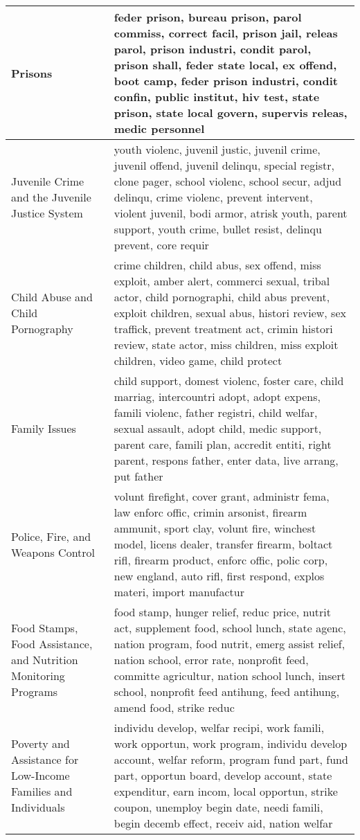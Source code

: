 \begin{longtable}{p{}p{}}
   \hline
Prisons & feder prison, bureau prison, parol commiss, correct facil, prison jail, releas parol, prison industri, condit parol, prison shall, feder state local, ex offend, boot camp, feder prison industri, condit confin, public institut, hiv test, state prison, state local govern, supervis releas, medic personnel \\ 
   \hline
Juvenile Crime and the Juvenile Justice System & youth violenc, juvenil justic, juvenil crime, juvenil offend, juvenil delinqu, special registr, clone pager, school violenc, school secur, adjud delinqu, crime violenc, prevent intervent, violent juvenil, bodi armor, atrisk youth, parent support, youth crime, bullet resist, delinqu prevent, core requir \\ 
   \hline
Child Abuse and Child Pornography & crime children, child abus, sex offend, miss exploit, amber alert, commerci sexual, tribal actor, child pornographi, child abus prevent, exploit children, sexual abus, histori review, sex traffick, prevent treatment act, crimin histori review, state actor, miss children, miss exploit children, video game, child protect \\ 
   \hline
Family Issues & child support, domest violenc, foster care, child marriag, intercountri adopt, adopt expens, famili violenc, father registri, child welfar, sexual assault, adopt child, medic support, parent care, famili plan, accredit entiti, right parent, respons father, enter data, live arrang, put father \\ 
   \hline
Police, Fire, and Weapons Control & volunt firefight, cover grant, administr fema, law enforc offic, crimin arsonist, firearm ammunit, sport clay, volunt fire, winchest model, licens dealer, transfer firearm, boltact rifl, firearm product, enforc offic, polic corp, new england, auto rifl, first respond, explos materi, import manufactur \\ 
   \hline
Food Stamps, Food Assistance, and Nutrition Monitoring Programs & food stamp, hunger relief, reduc price, nutrit act, supplement food, school lunch, state agenc, nation program, food nutrit, emerg assist relief, nation school, error rate, nonprofit feed, committe agricultur, nation school lunch, insert school, nonprofit feed antihung, feed antihung, amend food, strike reduc \\ 
   \hline
Poverty and Assistance for Low-Income Families and Individuals & individu develop, welfar recipi, work famili, work opportun, work program, individu develop account, welfar reform, program fund part, fund part, opportun board, develop account, state expenditur, earn incom, local opportun, strike coupon, unemploy begin date, needi famili, begin decemb effect, receiv aid, nation welfar \\ 

\end{longtable}

